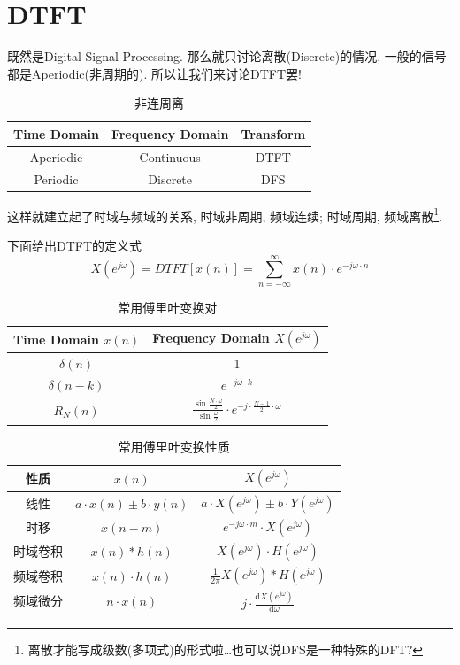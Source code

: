 \documentclass[a4paper]{report}
\begin{document}
\section{DTFT}
既然是Digital Signal Processing. 那么就只讨论离散(Discrete)的情况, 一般的信号都是Aperiodic(非周期的). 所以让我们来讨论DTFT罢! 

\begin{table}[H]
  \centering
    \begin{tabular}{ccc}
    Time Domain & Frequency Domain & Transform \\
    \hline
    Aperiodic & Continuous & DTFT\\
    Periodic & Discrete & DFS \\
    \end{tabular}%
  \caption{非连周离}
\end{table}%

这样就建立起了时域与频域的关系, 时域非周期, 频域连续; 时域周期, 频域离散\footnote{离散才能写成级数(多项式)的形式啦\dots 也可以说DFS是一种特殊的DFT? }. 

下面给出DTFT的定义式
\begin{equation}
  X(e^{j\omega})=DTFT[x(n)]=\displaystyle\sum_{n=-\infty}^{\infty}x(n)\cdot e^{-j\omega\cdot n}
\end{equation}

\begin{table}[H]
  \centering
    \begin{tabular}{cc}
    Time Domain $x(n)$ & Frequency Domain $X(e^{j\omega})$ \\
    \hline
    $\delta(n)$ & 1 \\
    $\delta(n-k)$ & $e^{-j\omega\cdot k}$  \\
    $R_N(n)$&$\frac{\sin{\frac{N\cdot\omega}{2}}}{\sin{\frac{\omega}{2}}}\cdot e^{-j\cdot\frac{N-1}{2}\cdot\omega}$
    \end{tabular}%
  \caption{常用傅里叶变换对}
\end{table}%

\begin{table}[H]
  \centering
    \begin{tabular}{ccc}
    性质& $x(n)$ &  $X(e^{j\omega})$ \\
    \hline
    线性&$a\cdot x(n)\pm b\cdot y(n)$ & $a\cdot X(e^{j\omega})\pm b\cdot Y(e^{j\omega})$ \\
    时移&$x(n-m)$ & $e^{-j\omega\cdot m}\cdot X(e^{j\omega})$  \\
    时域卷积 & $x(n)*h(n)$ & $X(e^{j\omega})\cdot H(e^{j\omega})$\\
    频域卷积 & $x(n)\cdot h(n)$ & $\frac{1}{2\pi}X(e^{j\omega})* H(e^{j\omega})$\\
    频域微分 & $n\cdot x(n)$ & $j\cdot \frac{\text{d} X(e^{j\omega})}{\text{d}\omega}$
    \end{tabular}%
  \caption{常用傅里叶变换性质}
\end{table}%
\end{document}
